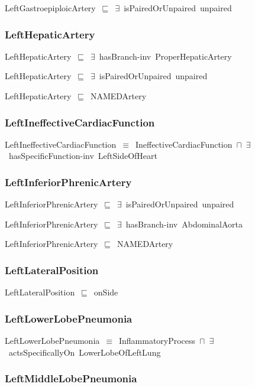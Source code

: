 \documentclass{article}
\begin{document}
LeftGastroepiploicArtery~\ensuremath{\sqsubseteq}~\ensuremath{\exists}~isPairedOrUnpaired~unpaired~

\subsubsection*{LeftHepaticArtery}

LeftHepaticArtery~\ensuremath{\sqsubseteq}~\ensuremath{\exists}~hasBranch-inv~ProperHepaticArtery~

LeftHepaticArtery~\ensuremath{\sqsubseteq}~\ensuremath{\exists}~isPairedOrUnpaired~unpaired~

LeftHepaticArtery~\ensuremath{\sqsubseteq}~NAMEDArtery~

\subsubsection*{LeftIneffectiveCardiacFunction}

LeftIneffectiveCardiacFunction~\ensuremath{\equiv}~IneffectiveCardiacFunction~\ensuremath{\sqcap}~\ensuremath{\exists}~hasSpecificFunction-inv~LeftSideOfHeart

\subsubsection*{LeftInferiorPhrenicArtery}

LeftInferiorPhrenicArtery~\ensuremath{\sqsubseteq}~\ensuremath{\exists}~isPairedOrUnpaired~unpaired~

LeftInferiorPhrenicArtery~\ensuremath{\sqsubseteq}~\ensuremath{\exists}~hasBranch-inv~AbdominalAorta~

LeftInferiorPhrenicArtery~\ensuremath{\sqsubseteq}~NAMEDArtery~

\subsubsection*{LeftLateralPosition}

LeftLateralPosition~\ensuremath{\sqsubseteq}~onSide~

\subsubsection*{LeftLowerLobePneumonia}

LeftLowerLobePneumonia~\ensuremath{\equiv}~InflammatoryProcess~\ensuremath{\sqcap}~\ensuremath{\exists}~actsSpecificallyOn~LowerLobeOfLeftLung

\subsubsection*{LeftMiddleLobePneumonia}
\end{document}
